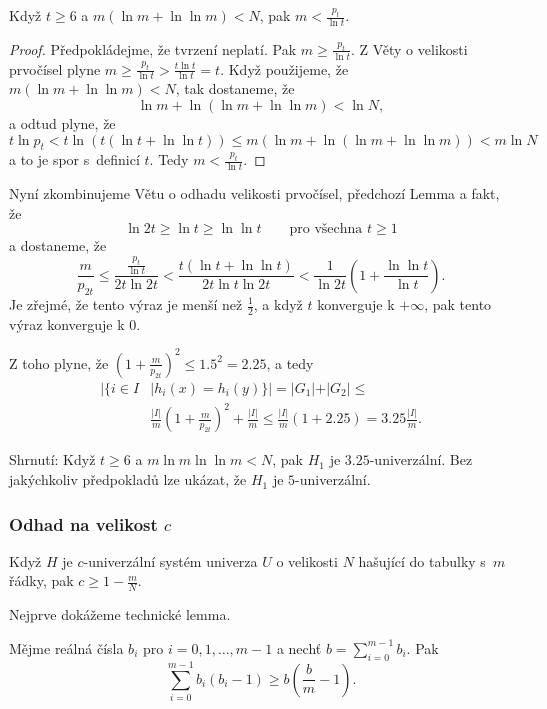 \documentclass[a4paper,12pt]{article}
\begin{document}
\begin{lemma}Když $t\ge 6$ a $m(\ln m+\ln\ln m)<N$, pak $m<\frac {
p_t}{\ln t}$.
\end{lemma}

\begin{proof}Předpokládejme, že tvrzení neplatí. Pak $
m\ge\frac {p_t}{\ln t}$. Z Věty o velikosti 
prvo\-čí\-sel plyne $m\ge\frac {p_t}{\ln t}>\frac {t\ln 
t}{\ln t}=t$. Když použijeme, že 
$m(\ln m+\ln\ln m)<N$, tak dostaneme, že 
$$\ln m+\ln(\ln m+\ln\ln m)<\ln N,$$
a odtud plyne, že 
$$t\ln p_t<t\ln(t(\ln t+\ln\ln t))\le m(\ln m+\ln(\ln m+\ln\ln m)
)<m\ln N$$
a to je spor s~definicí $t$. Tedy $m<\frac {p_t}{\ln t}$.
\end{proof}

Nyní zkombinujeme Větu o odhadu velikosti prvočísel, 
před\-cho\-zí Lemma a fakt, že 
$$\ln2t\ge\ln t\ge\ln\ln t\qquad\text{pro všechna }t\ge 1$$
a dostaneme, že
$$\frac m{p_{2t}}\le\frac {\frac {p_t}{\ln t}}{2t\ln2t}<\frac {t(\ln 
t+\ln\ln t)}{2t\ln t\ln2t}<\frac 1{\ln2t}(1+\frac {\ln\ln t}{\ln 
t}).$$
Je zřejmé, že tento výraz je menší než $\frac 
12$, 
a když $t$ konverguje k $+\infty$, pak tento výraz konverguje k $
0$.

Z toho plyne, že $(1+\frac m{p_{2t}})^2\le 1.5^2=2.2
5$, a tedy 
\begin{align*}|\{i\in I&\mid h_i(x)=h_i(y)\}|=|G_1|+|G_2|\le\\
&\frac {|I|}m(1+\frac m{p_{2t}})^2+\frac {|I|}m\le\frac {|I|}m(1+
2.25)=3.25\frac {|I|}m.\end{align*}

Shrnutí: Když $t\ge 6$ a $m\ln m\ln\ln m<N$, pak $
H_1$ je 
$3.25$-univerzální. Bez jakýchkoliv předpokladů lze 
ukázat, že $H_1$ je $5$-univerzální.

\subsubsection{Odhad na velikost $c$}

\begin{veta}Když $H$ je $c$-univerzální 
systém univerza $U$ o velikosti $N$ hašující do tabulky s~$
m$ řádky, 
pak $c\ge 1-\frac mN$.
\end{veta}

Nejprve dokážeme technické lemma.

\begin{lemma}Mějme reálná čísla $b_i$ pro $i=0,1
,\dots,m-1$ a 
nechť $b=\sum_{i=0}^{m-1}b_i$. Pak 
$$\sum_{i=0}^{m-1}b_i(b_i-1)\ge b(\frac bm-1).$$
\end{lemma}
\end{document}
